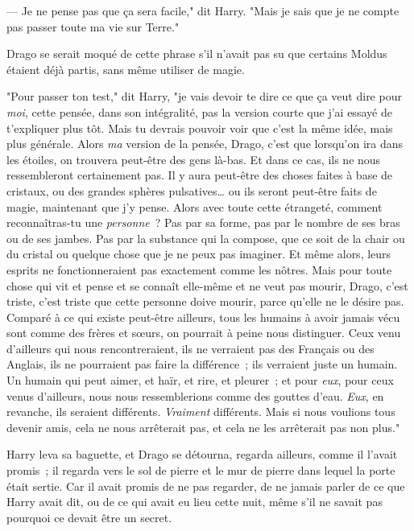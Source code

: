 --- Je ne pense pas que ça sera facile," dit Harry. "Mais je sais que je ne compte pas passer toute ma vie sur Terre."

Drago se serait moqué de cette phrase s'il n'avait pas su que certains Moldus étaient déjà partis, sans même utiliser de magie.

"Pour passer ton test," dit Harry, "je vais devoir te dire ce que ça veut dire pour \emph{moi}, cette pensée, dans son intégralité, pas la version courte que j'ai essayé de t'expliquer plus tôt. Mais tu devrais pouvoir voir que c'est la même idée, mais plus générale. Alors \emph{ma} version de la pensée, Drago, c'est que lorsqu'on ira dans les étoiles, on trouvera peut-être des gens là-bas. Et dans ce cas, ils ne nous ressembleront certainement pas. Il y aura peut-être des choses faites à base de cristaux, ou des grandes sphères pulsatives… ou ils seront peut-être faits de magie, maintenant que j'y pense. Alors avec toute cette étrangeté, comment reconnaîtras-tu une \emph{personne}~? Pas par sa forme, pas par le nombre de ses bras ou de ses jambes. Pas par la substance qui la compose, que ce soit de la chair ou du cristal ou quelque chose que je ne peux pas imaginer. Et même alors, leurs esprits ne fonctionneraient pas exactement comme les nôtres. Mais pour toute chose qui vit et pense et se connaît elle-même et ne veut pas mourir, Drago, c'est triste, c'est triste que cette personne doive mourir, parce qu'elle ne le désire pas. Comparé à ce qui existe peut-être ailleurs, tous les humains à avoir jamais vécu sont comme des frères et sœurs, on pourrait à peine nous distinguer. Ceux venu d'ailleurs qui nous rencontreraient, ils ne verraient pas des Français ou des Anglais, ils ne pourraient pas faire la différence~; ils verraient juste un humain. Un humain qui peut aimer, et haïr, et rire, et pleurer~; et pour \emph{eux}, pour ceux venus d'ailleurs, nous nous ressemblerions comme des gouttes d'eau. \emph{Eux}, en revanche, ils seraient différents. \emph{Vraiment} différents. Mais si nous voulions tous devenir amis, cela ne nous arrêterait pas, et cela ne les arrêterait pas non plus."

Harry leva sa baguette, et Drago se détourna, regarda ailleurs, comme il l'avait promis~; il regarda vers le sol de pierre et le mur de pierre dans lequel la porte était sertie. Car il avait promis de ne pas regarder, de ne jamais parler de ce que Harry avait dit, ou de ce qui avait eu lieu cette nuit, même s'il ne savait pas pourquoi ce devait être un secret.

